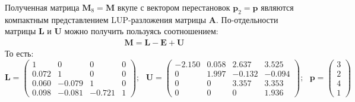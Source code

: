 Полученная матрица $\mathbf{M}_8=\mathbf{M}$ вкупе с вектором перестановок $\mathbf{p}_2=\mathbf{p}$ являются компактным представлением LUP-разложения матрицы $\mathbf{A}$. По-отдельности матрицы $\mathbf{L}$ и $\mathbf{U}$ можно получить пользуясь соотношением:
\begin{align}
    \mathbf{M} = \mathbf{L} - \mathbf{E} + \mathbf{U}
\end{align}
То есть:
\begin{equation}
    \mathbf{L} =
    \begin{pmatrix}
        1&      0&      0&  0\\
        0.072&  1&     0& 0\\
        0.060& -0.079&  1&  0\\
        0.098& -0.081& -0.721& 1
    \end{pmatrix};~~~\mathbf{U} =
    \begin{pmatrix}
       -2.150&  0.058&  2.637&  3.525\\
        0&      1.997& -0.132& -0.094\\
        0&     0&      3.357&  3.353\\
        0&     0&     0&     1.936
    \end{pmatrix};~~~
    \mathbf{p} = \begin{pmatrix} 3 \\ 2 \\ 4 \\ 1  \end{pmatrix}
\end{equation}

